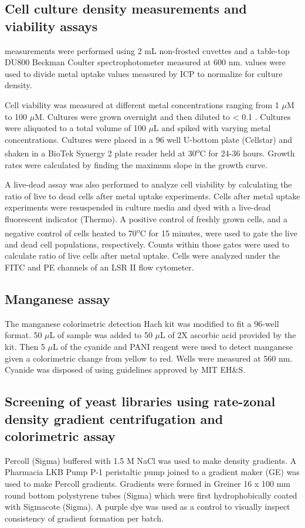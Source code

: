 \documentclass[../main/main]{subfiles}
\begin{document}
\subsection*{Cell culture density measurements and viability assays}
\OD{} measurements were performed using 2 mL non-frosted cuvettes and a table-top DU800 Beckman Coulter spectrophotometer measured at 600 nm. \OD{} values were used to divide metal uptake values measured by ICP to normalize for culture density.

Cell viability was measured at different metal concentrations ranging from 1 $\mu$M to 100 $\mu$M. Cultures were grown overnight and then diluted to < 0.1 \OD{}. Cultures were aliquoted to a total volume of 100 $\mu$L and spiked with varying metal concentrations. Cultures were placed in a 96 well U-bottom plate (Cellstar) and shaken in a BioTek Synergy 2 plate reader held at 30\textsuperscript{o}C for 24-36 hours. Growth rates were calculated by finding the maximum slope in the growth curve.

A live-dead assay was also performed to analyze cell viability by calculating the ratio of live to dead cells after metal uptake experiments. Cells after metal uptake experiments were resuspended in culture media and dyed with a live-dead fluorescent indicator (Thermo). A positive control of freshly grown cells, and a negative control of cells heated to 70\textsuperscript{o}C for 15 minutes, were used to gate the live and dead cell populations, respectively. Counts within those gates were used to calculate ratio of live cells after metal uptake. Cells were analyzed under the FITC and PE channels of an LSR II flow cytometer.

\subsection*{Manganese assay}
The manganese colorimetric detection Hach kit was modified to fit a 96-well format. 50 $\mu$L of sample was added to 50 $\mu$L of 2X ascorbic acid provided by the kit. Then 5 $\mu$L of the cyanide and PANI reagent were used to detect manganese given a colorimetric change from yellow to red. Wells were measured at 560 nm. Cyanide was disposed of using guidelines approved by MIT EH\&S.

\subsection*{Screening of yeast libraries using rate-zonal density gradient centrifugation and colorimetric assay}
Percoll (Sigma) buffered with 1.5 M NaCl was used to make density gradients. A Pharmacia LKB Pump P-1 peristaltic pump joined to a gradient maker (GE) was used to make Percoll gradients. Gradients were formed in Greiner 16 x 100 mm round bottom polystyrene tubes (Sigma) which were first hydrophobically coated with Sigmacote (Sigma). A purple dye was used as a control to visually inspect consistency of gradient formation per batch.
\end{document}
